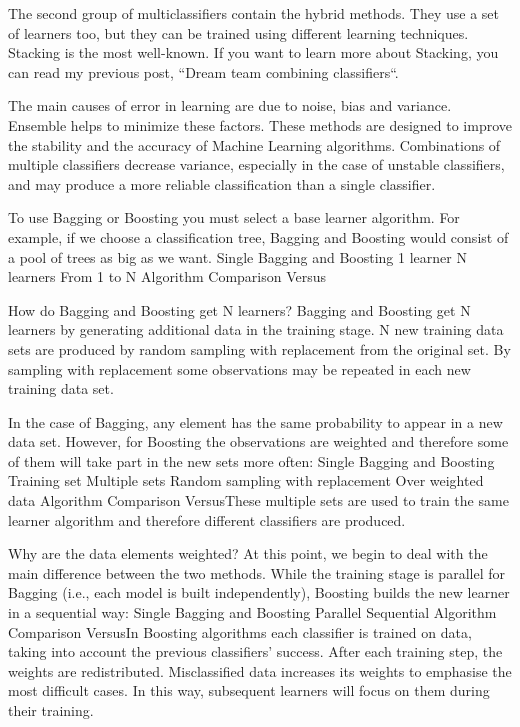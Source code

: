 \documentclass[]{book}
\theoremstyle{definition}
\theoremstyle{definition}
\theoremstyle{definition}
\theoremstyle{remark}
\begin{document}
The second group of multiclassifiers contain the hybrid methods. They
use a set of learners too, but they can be trained using different
learning techniques. Stacking is the most well-known. If you want to
learn more about Stacking, you can read my previous post, ``Dream team
combining classifiers``.

The main causes of error in learning are due to noise, bias and
variance. Ensemble helps to minimize these factors. These methods are
designed to improve the stability and the accuracy of Machine Learning
algorithms. Combinations of multiple classifiers decrease variance,
especially in the case of unstable classifiers, and may produce a more
reliable classification than a single classifier.

To use Bagging or Boosting you must select a base learner algorithm. For
example, if we choose a classification tree, Bagging and Boosting would
consist of a pool of trees as big as we want. Single Bagging and
Boosting 1 learner N learners From 1 to N Algorithm Comparison Versus

How do Bagging and Boosting get N learners? Bagging and Boosting get N
learners by generating additional data in the training stage. N new
training data sets are produced by random sampling with replacement from
the original set. By sampling with replacement some observations may be
repeated in each new training data set.

In the case of Bagging, any element has the same probability to appear
in a new data set. However, for Boosting the observations are weighted
and therefore some of them will take part in the new sets more often:
Single Bagging and Boosting Training set Multiple sets Random sampling
with replacement Over weighted data Algorithm Comparison VersusThese
multiple sets are used to train the same learner algorithm and therefore
different classifiers are produced.

Why are the data elements weighted? At this point, we begin to deal with
the main difference between the two methods. While the training stage is
parallel for Bagging (i.e., each model is built independently), Boosting
builds the new learner in a sequential way: Single Bagging and Boosting
Parallel Sequential Algorithm Comparison VersusIn Boosting algorithms
each classifier is trained on data, taking into account the previous
classifiers' success. After each training step, the weights are
redistributed. Misclassified data increases its weights to emphasise the
most difficult cases. In this way, subsequent learners will focus on
them during their training.
\end{document}
